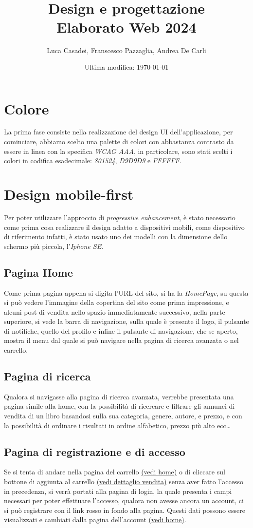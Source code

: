 \documentclass[a4paper]{report}
\author{Luca Casadei, Franscesco Pazzaglia, Andrea De Carli}
\title{\textbf{Design e progettazione\\Elaborato Web 2024}}
\date{Ultima modifica: \today}
\begin{document}
	\maketitle
	\section{Colore}
	La prima fase consiste nella realizzazione del design UI dell'applicazione, per cominciare, abbiamo scelto una palette di colori con abbastanza contrasto da essere in linea con la specifica \textit{WCAG AAA}, in particolare, sono stati scelti i colori in codifica esadecimale: \textit{801524}, \textit{D9D9D9} e \textit{FFFFFF}.
	\section{Design mobile-first}
	Per poter utilizzare l'approccio di \textit{progressive enhancement}, è stato necessario come prima cosa realizzare il design adatto a dispositivi mobili, come dispositivo di riferimento infatti, è stato usato uno dei modelli con la dimensione dello schermo più piccola, l'\textit{Iphone SE}.
	\subsection{Pagina Home} \label{ss:home}
	Come prima pagina appena si digita l'URL del sito, si ha la \textit{HomePage}, su questa si può vedere l'immagine della copertina del sito come prima impressione, e alcuni post di vendita nello spazio immediatamente successivo, nella parte superiore, si vede la barra di navigazione, sulla quale è presente il logo, il pulsante di notifiche, quello del profilo e infine il pulsante di navigazione, che se aperto, mostra il menu dal quale si può navigare nella pagina di ricerca avanzata o nel carrello.
	\subsection{Pagina di ricerca}
	Qualora si navigasse alla pagina di ricerca avanzata, verrebbe presentata una pagina simile alla home, con la possibilità di ricercare e filtrare gli annunci di vendita di un libro basandosi sulla sua categoria, genere, autore, e prezzo, e con la possibilità di ordinare i risultati in ordine alfabetico, prezzo più alto ecc\dots
	\subsection{Pagina di registrazione e di accesso}
	Se si tenta di andare nella pagina del carrello \hyperref[ss:home]{(vedi home)} o di cliccare sul bottone di aggiunta al carrello \hyperref[ss:home]{(vedi dettaglio vendita)} senza aver fatto l'accesso in precedenza, si verrà portati alla pagina di login, la quale presenta i campi necessari per poter effettuare l'accesso, qualora non avesse ancora un account, ci si può registrare con il link rosso in fondo alla pagina. Questi dati possono essere visualizzati e cambiati dalla pagina dell'account \hyperref[ss:home]{(vedi home)}.
\end{document}

